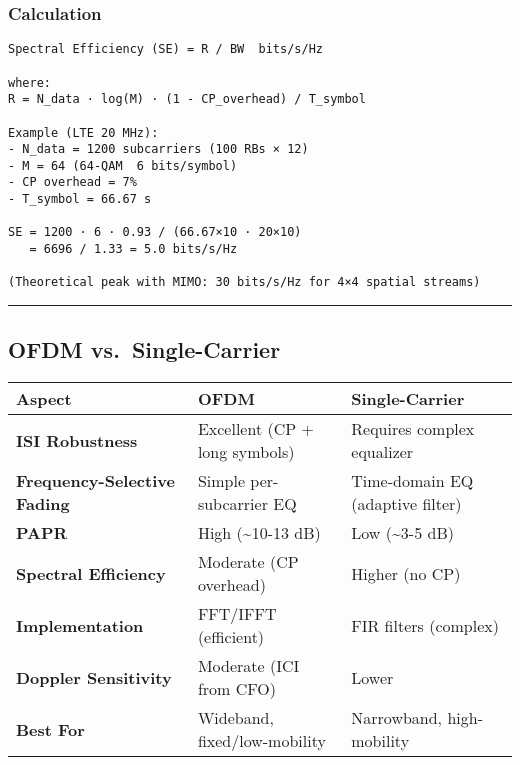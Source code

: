 \subsubsection{Calculation}\label{calculation}

\begin{verbatim}
Spectral Efficiency (SE) = R / BW  bits/s/Hz

where:
R = N_data · log(M) · (1 - CP_overhead) / T_symbol

Example (LTE 20 MHz):
- N_data = 1200 subcarriers (100 RBs × 12)
- M = 64 (64-QAM  6 bits/symbol)
- CP overhead = 7%
- T_symbol = 66.67 s

SE = 1200 · 6 · 0.93 / (66.67×10 · 20×10)
   = 6696 / 1.33 = 5.0 bits/s/Hz

(Theoretical peak with MIMO: 30 bits/s/Hz for 4×4 spatial streams)
\end{verbatim}

\begin{center}\rule{0.5\linewidth}{0.5pt}\end{center}

\subsection{\texorpdfstring{ OFDM
vs.~Single-Carrier}{ OFDM vs.~Single-Carrier}}\label{ofdm-vs.-single-carrier}

{\def\LTcaptype{} %
\begin{longtable}[]{@{}
  >{\raggedright\arraybackslash}p{}
  >{\raggedright\arraybackslash}p{}
  >{\raggedright\arraybackslash}p{}@{}}
\toprule\noalign{}
\begin{minipage}[b]{\linewidth}\raggedright
Aspect
\end{minipage} & \begin{minipage}[b]{\linewidth}\raggedright
OFDM
\end{minipage} & \begin{minipage}[b]{\linewidth}\raggedright
Single-Carrier
\end{minipage} \\
\midrule\noalign{}
\endhead
\bottomrule\noalign{}
\endlastfoot
\textbf{ISI Robustness} & Excellent (CP + long symbols) & Requires
complex equalizer \\
\textbf{Frequency-Selective Fading} & Simple per-subcarrier EQ &
Time-domain EQ (adaptive filter) \\
\textbf{PAPR} & High (\textasciitilde10-13 dB) & Low (\textasciitilde3-5
dB) \\
\textbf{Spectral Efficiency} & Moderate (CP overhead) & Higher (no
CP) \\
\textbf{Implementation} & FFT/IFFT (efficient) & FIR filters
(complex) \\
\textbf{Doppler Sensitivity} & Moderate (ICI from CFO) & Lower \\
\textbf{Best For} & Wideband, fixed/low-mobility & Narrowband,
high-mobility \\
\end{longtable}
}

